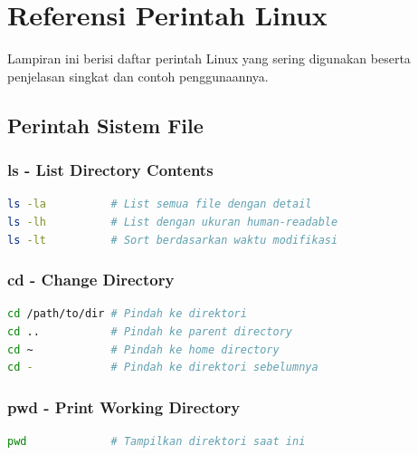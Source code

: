 
\chapter{Referensi Perintah Linux}
\label{app:command-reference}

Lampiran ini berisi daftar perintah Linux yang sering digunakan beserta penjelasan
singkat dan contoh penggunaannya.

\section{Perintah Sistem File}

\subsection{ls - List Directory Contents}
\begin{lstlisting}[language=bash]
ls -la          # List semua file dengan detail
ls -lh          # List dengan ukuran human-readable
ls -lt          # Sort berdasarkan waktu modifikasi
\end{lstlisting}

\subsection{cd - Change Directory}
\begin{lstlisting}[language=bash]
cd /path/to/dir # Pindah ke direktori
cd ..           # Pindah ke parent directory
cd ~            # Pindah ke home directory
cd -            # Pindah ke direktori sebelumnya
\end{lstlisting}

\subsection{pwd - Print Working Directory}
\begin{lstlisting}[language=bash]
pwd             # Tampilkan direktori saat ini
\end{lstlisting}


